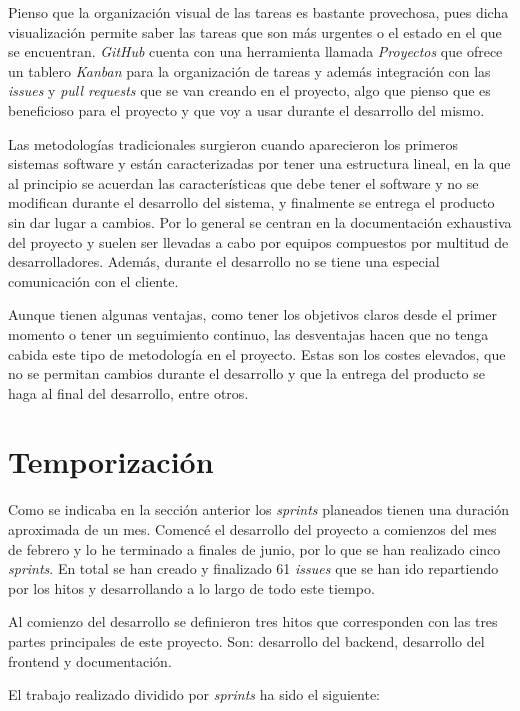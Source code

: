 Pienso que la organización visual de las tareas es bastante provechosa, pues dicha visualización permite saber las tareas que son más urgentes o el estado en el que se encuentran. \textit{GitHub} cuenta con una herramienta llamada \textit{Proyectos} que ofrece un tablero \textit{Kanban} para la organización de tareas y además integración con las \textit{issues} y \textit{pull requests} que se van creando en el proyecto, algo que pienso que es beneficioso para el proyecto y que voy a usar durante el desarrollo del mismo.

Las metodologías tradicionales surgieron cuando aparecieron los primeros sistemas software y están caracterizadas por tener una estructura lineal, en la que al principio se acuerdan las características que debe tener el software y no se modifican durante el desarrollo del sistema, y finalmente se entrega el producto sin dar lugar a cambios. Por lo general se centran en la documentación exhaustiva del proyecto y suelen ser llevadas a cabo por equipos compuestos por multitud de desarrolladores. Además, durante el desarrollo no se tiene una especial comunicación con el cliente.

Aunque tienen algunas ventajas, como tener los objetivos claros desde el primer momento o tener un seguimiento continuo, las desventajas hacen que no tenga cabida este tipo de metodología en el proyecto. Estas son los costes elevados, que no se permitan cambios durante el desarrollo y que la entrega del producto se haga al final del desarrollo, entre otros.


\section{Temporización}

Como se indicaba en la sección anterior los \textit{sprints} planeados tienen una duración aproximada de un mes. Comencé el desarrollo del proyecto a comienzos del mes de febrero y lo he terminado a finales de junio, por lo que se han realizado cinco \textit{sprints}. En total se han creado y finalizado 61 \textit{issues} que se han ido repartiendo por los hitos y desarrollando a lo largo de todo este tiempo. 

Al comienzo del desarrollo se definieron tres hitos que corresponden con las tres partes principales de este proyecto. Son: desarrollo del backend, desarrollo del frontend y documentación.

\bigskip
El trabajo realizado dividido por \textit{sprints} ha sido el siguiente:

